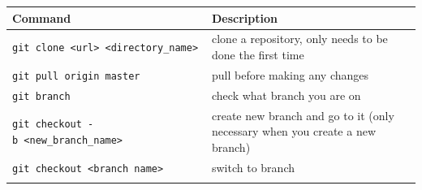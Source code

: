 \documentclass[]{book}
\begin{document}
\begin{longtable}[]{@{}ll@{}}
\toprule
\begin{minipage}[b]{0.34\columnwidth}\raggedright
Command\strut
\end{minipage} & \begin{minipage}[b]{0.60\columnwidth}\raggedright
Description\strut
\end{minipage}\tabularnewline
\midrule
\endhead
\begin{minipage}[t]{0.34\columnwidth}\raggedright
\texttt{git\ clone\ \textless{}url\textgreater{}\ \textless{}directory\_name\textgreater{}}\strut
\end{minipage} & \begin{minipage}[t]{0.60\columnwidth}\raggedright
clone a repository, only needs to be done the first time\strut
\end{minipage}\tabularnewline
\begin{minipage}[t]{0.34\columnwidth}\raggedright
\texttt{git\ pull\ origin\ master}\strut
\end{minipage} & \begin{minipage}[t]{0.60\columnwidth}\raggedright
pull before making any changes\strut
\end{minipage}\tabularnewline
\begin{minipage}[t]{0.34\columnwidth}\raggedright
\texttt{git\ branch}\strut
\end{minipage} & \begin{minipage}[t]{0.60\columnwidth}\raggedright
check what branch you are on\strut
\end{minipage}\tabularnewline
\begin{minipage}[t]{0.34\columnwidth}\raggedright
\texttt{git\ checkout\ -b\ \textless{}new\_branch\_name\textgreater{}}\strut
\end{minipage} & \begin{minipage}[t]{0.60\columnwidth}\raggedright
create new branch and go to it (only necessary when you create a new branch)\strut
\end{minipage}\tabularnewline
\begin{minipage}[t]{0.34\columnwidth}\raggedright
\texttt{git\ checkout\ \textless{}branch\ name\textgreater{}}\strut
\end{minipage} & \begin{minipage}[t]{0.60\columnwidth}\raggedright
switch to branch\strut
\end{minipage}\tabularnewline
\begin{minipage}[t]{0.34\columnwidth}\raggedright

\end{minipage}
\end{longtable}
\end{document}
